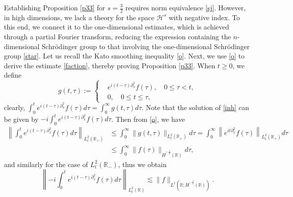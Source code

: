 \documentclass[preprint,compress,12pt]{elsarticle}
\numberwithin{equation}{section}
\begin{document}
Establishing Proposition \ref{p33} for $s=\frac{3}{2}$ requires norm equivalence \eqref{sj}. However, in high dimensions, we lack a theory for the space $\mathcal{H}^{s}$ with negative index. To this end, we connect it to the one-dimensional estimates, which is achieved through a partial Fourier transform, reducing the expression containing the $n$-dimensional Schr\"{o}dinger group to that involving the one-dimensional Schr\"{o}dinger group \eqref{star}. Let us recall the Kato smoothing inequality \eqref{o}. Next, we use \eqref{o} to derive the estimate \eqref{faction}, thereby proving Proposition \ref{p33}. When $t\geq0$, we define
\begin{equation*}
	g(t,\tau):=\left\{\begin{aligned}&e^{i(t-\tau)\partial_{x}^{2}}f(\tau),  \quad 0\leq\tau <t, \\&0, \quad  0\leq t\leq \tau, \end{aligned}\right.
\end{equation*}
clearly, $\int_{0}^{t} e^{i(t-\tau)\partial_{x}^{2}}f(\tau)d\tau=\int_{0}^{\infty}g(t,\tau)d\tau$.
Note that the solution of \eqref{inh} can be given by $-i\int_{0}^{t} e^{i(t-\tau)\partial_{x}^{2}}f(\tau)d\tau$. Then from \eqref{o}, we have
\begin{equation*}
	\begin{aligned}
		\left\|\int_{0}^{t} e^{i(t-\tau)\partial_{x}^{2}}f(\tau)d\tau\right\|_{L_{t}^{2}(\mathbb{R}_{+})}
		&\leq \int_{0}^{\infty}\|g(t,\tau)\|_{L_{t}^{2}(\mathbb{R}_{+})}d\tau	=\int_{0}^{\infty}\left\|e^{it\partial_{x}^{2}}f(\tau)\right\|_{L_{t}^{2}(\mathbb{R}_{+})}d\tau\\
		&\leq \int_{0}^{\infty}\|f(\tau)\|_{\dot{H}^{-\frac{1}{2}}(\mathbb{R})}d\tau,
	\end{aligned}
\end{equation*}
and similarly for the case of $L_{t}^{2}(\mathbb{R}_{-})$, thus we obtain
\begin{equation}\label{faction}
	\left\|-i\int_{0}^{t} e^{i(t-\tau)\partial_{x}^{2}}f(\tau)d\tau\right\|_{L_{t}^{2}(\mathbb{R})}\lesssim\|f\|_{L^{1}(\mathbb{R};\dot{H}^{-\frac{1}{2}}(\mathbb{R}))}.
\end{equation}	
\end{document}
